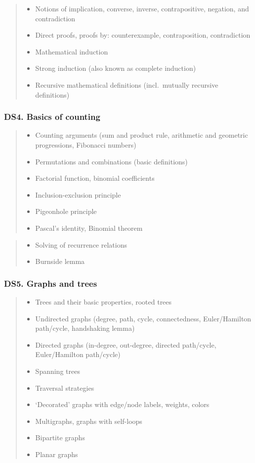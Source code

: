 \documentclass[a4paper,11pt,oneside]{article}
\newcommand{\cmark}{\ding{51}}%
\newcommand{\xmark}{\ding{55}}%
\newcommand{\CC}[1]{#1}
\newcommand{\Cincluded}{{\small\cmark}}
\newcommand{\Cdefine}{{\small\cmark\faFileTextO}}
\newcommand{\Ccodeonly}{{\small\cmark\faFileText}}
\newcommand{\Cexcluded}{{\small\xmark}}
\newcommand{\Iincluded}{\item[\hbox to 1.8em{\Cincluded\hfill}]}
\newcommand{\Idefine}{\item[\hbox to 1.8em{\Cdefine\hfill}]}
\newcommand{\Icodeonly}{\item[\hbox to 1.8em{\Ccodeonly\hfill}]}
\newcommand{\Iexcluded}{\item[\hbox to 1.8em{\Cexcluded\hfill}]}
\newenvironment{myitemize}{\begin{quote}\begin{itemize}\itemsep 0pt}{\end{itemize}\end{quote}}
\begin{document}
        \begin{myitemize}
        \Idefine\CC{Notions of implication, converse, inverse, contrapositive, negation, and contradiction}
        \Icodeonly\CC{Direct proofs, proofs by: counterexample, contraposition, contradiction}
        \Icodeonly\CC{Mathematical induction}
        \Icodeonly\CC{Strong induction} (also known as complete induction)
        \Iincluded\CC{Recursive mathematical definitions} (incl.\ mutually recursive definitions)
        \end{myitemize}

    \subsubsection*{DS4. Basics of counting}

        \begin{myitemize}
        \Iincluded\CC{Counting arguments (sum and product rule, arithmetic and geometric progressions, Fibonacci numbers)}
        \Idefine\CC{Permutations and combinations (basic definitions)}
        \Idefine Factorial function, binomial coefficients
        \Icodeonly\CC{Inclusion-exclusion principle}
        \Icodeonly\CC{Pigeonhole principle}
        \Icodeonly\CC{Pascal's identity}, \CC{Binomial theorem}
        \end{myitemize}

        \begin{myitemize}
        \Iexcluded Solving of recurrence relations
        \Iexcluded Burnside lemma
        \end{myitemize}
  
    \subsubsection*{DS5. Graphs and trees}

        \begin{myitemize}
        \Idefine\CC{Trees} and their basic properties, rooted trees
        \Idefine\CC{Undirected graphs} (degree, path, cycle, connectedness, Euler/Hamil\-ton path/cycle, handshaking lemma)
        \Idefine\CC{Directed graphs} (in-degree, out-degree, directed path/cycle, Euler/Hamilton path/cycle)
        \Idefine\CC{Spanning trees}
        \Idefine\CC{Traversal strategies}
        \Idefine `Decorated' graphs with edge/node labels, weights, colors
        \Idefine Multigraphs, graphs with self-loops
        \Idefine Bipartite graphs
        \Icodeonly Planar graphs
        \end{myitemize}
\end{document}
